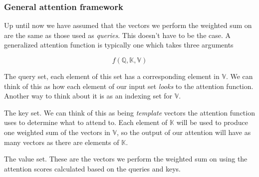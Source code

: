 \documentclass{beamer}
\begin{document}
\begin{frame}
  \frametitle{General attention framework}
  \begin{itemize}
  \item Up until now we have assumed that the vectors we perform the weighted sum on are the same as those used as \emph{queries}. This doesn't have to be the case. A generalized attention function is typically one which takes three arguments

    \[ f(\mathbb{Q}, \mathbb{K}, \mathbb{V}) \]

   {\footnotesize
  \item[$\mathbb{Q}$] The query set, each element of this set has a
    corresponding element in $\mathbb{V}$. We can think of this as how
    each element of our input set \emph{looks} to the attention
    function. Another way to think about it is as an indexing set for
    $\mathbb{V}$.
  \item[$\mathbb{K}$] The key set. We can think of this as being
    \emph{template} vectors the attention function uses to determine
    what to attend to. Each element of $\mathbb{K}$ will be used to
    produce one weighted sum of the vectors in $\mathbb{V}$, so the
    output of our attention will have as many vectors as there are
    elements of $\mathbb{K}$.
     \item[$\mathbb{V}$] The value set. These are the vectors we
       perform the weighted sum on using the attention scores
       calculated based on the queries and keys.
}
    \end{itemize}


\end{frame}



\end{document}
